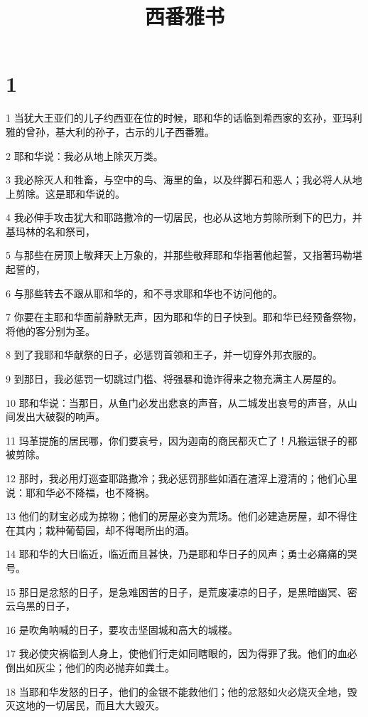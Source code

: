 

\title{西番雅书}


\chapter{1}

\par 1 当犹大王亚们的儿子约西亚在位的时候，耶和华的话临到希西家的玄孙，亚玛利雅的曾孙，基大利的孙子，古示的儿子西番雅。
\par 2 耶和华说：我必从地上除灭万类。
\par 3 我必除灭人和牲畜，与空中的鸟、海里的鱼，以及绊脚石和恶人；我必将人从地上剪除。这是耶和华说的。
\par 4 我必伸手攻击犹大和耶路撒冷的一切居民，也必从这地方剪除所剩下的巴力，并基玛林的名和祭司，
\par 5 与那些在房顶上敬拜天上万象的，并那些敬拜耶和华指著他起誓，又指著玛勒堪起誓的，
\par 6 与那些转去不跟从耶和华的，和不寻求耶和华也不访问他的。
\par 7 你要在主耶和华面前静默无声，因为耶和华的日子快到。耶和华已经预备祭物，将他的客分别为圣。
\par 8 到了我耶和华献祭的日子，必惩罚首领和王子，并一切穿外邦衣服的。
\par 9 到那日，我必惩罚一切跳过门槛、将强暴和诡诈得来之物充满主人房屋的。
\par 10 耶和华说：当那日，从鱼门必发出悲哀的声音，从二城发出哀号的声音，从山间发出大破裂的响声。
\par 11 玛革提施的居民哪，你们要哀号，因为迦南的商民都灭亡了！凡搬运银子的都被剪除。
\par 12 那时，我必用灯巡查耶路撒冷；我必惩罚那些如酒在渣滓上澄清的；他们心里说：耶和华必不降福，也不降祸。
\par 13 他们的财宝必成为掠物；他们的房屋必变为荒场。他们必建造房屋，却不得住在其内；栽种葡萄园，却不得喝所出的酒。
\par 14 耶和华的大日临近，临近而且甚快，乃是耶和华日子的风声；勇士必痛痛的哭号。
\par 15 那日是忿怒的日子，是急难困苦的日子，是荒废凄凉的日子，是黑暗幽冥、密云乌黑的日子，
\par 16 是吹角呐喊的日子，要攻击坚固城和高大的城楼。
\par 17 我必使灾祸临到人身上，使他们行走如同瞎眼的，因为得罪了我。他们的血必倒出如灰尘；他们的肉必抛弃如粪土。
\par 18 当耶和华发怒的日子，他们的金银不能救他们；他的忿怒如火必烧灭全地，毁灭这地的一切居民，而且大大毁灭。

